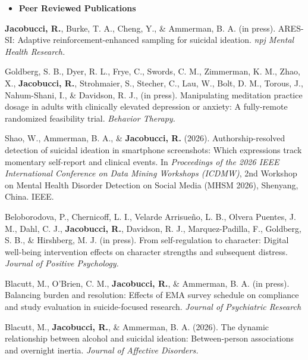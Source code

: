 \documentclass[letterpaper,10pt]{article}
\begin{document}
	
\vspace{3mm}
\begin{itemize}
	\item {\textbf{\large{Peer Reviewed Publications}}}
\end{itemize}
\begin{etaremune}
	
	\item  \textbf{Jacobucci, R.}, Burke, T. A., Cheng, Y., \& Ammerman, B. A. (in press). ARES-SI: Adaptive reinforcement-enhanced sampling for suicidal ideation. \emph{npj Mental Health Research.}
	
	\item Goldberg, S. B., Dyer, R. L., Frye, C., Swords, C. M., Zimmerman, K. M., Zhao, X., \textbf{Jacobucci, R.}, Strohmaier, S., Stecher, C., Lau, W., Bolt, D. M., Torous, J., Nahum-Shani, I., \& Davidson, R. J., (in press). Manipulating meditation practice dosage in adults 
	with clinically elevated depression or anxiety: A fully-remote randomized feasibility trial. \emph{Behavior Therapy.}
	
		\item Shao, W., Ammerman, B. A., \& \textbf{Jacobucci, R.} (2026). Authorship-resolved detection of suicidal ideation in smartphone screenshots: Which expressions track momentary self-report and clinical events. In \emph{Proceedings of the 2026 IEEE International Conference on Data Mining Workshops (ICDMW)}, 2nd Workshop on Mental Health Disorder Detection on Social Media (MHSM 2026), Shenyang, China. IEEE.
	
	\item Beloborodova, P., Chernicoff, L. I., Velarde Arrisueño, L. B., Olvera Puentes, J. M., Dahl, C. J., \textbf{Jacobucci, R.}, Davidson, R. J., Marquez-Padilla, F., Goldberg, S. B., \& Hirshberg, M. J. (in press). From self-regulation to character: Digital well-being intervention effects on character strengths and subsequent distress. \emph{Journal of Positive Psychology.}
	
		\item Blacutt, M., O'Brien, C. M., \textbf{Jacobucci, R.}, \& Ammerman, B. A. (in press). Balancing burden and resolution: Effects of EMA survey schedule on compliance and study evaluation in suicide-focused research. \emph{Journal of Psychiatric Research}
	
	\item Blacutt, M., \textbf{Jacobucci, R.}, \& Ammerman, B. A. (2026). The dynamic relationship between alcohol and suicidal ideation: Between-person associations and overnight inertia. \emph{Journal of Affective Disorders.}
	

\end{etaremune}
\end{document}

